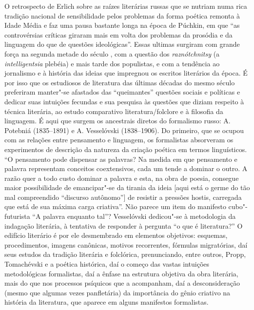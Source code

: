 O retrospecto de Erlich sobre as raízes literárias russas que se nutriam
numa rica tradição nacional de sensibilidade pelos problemas da forma
poética remonta à Idade Média e faz uma pausa bastante longa na época de
Púchkin, em que ``as controvérsias críticas giraram mais em volta dos
problemas da prosódia e da linguagem do que de questões ideológicas''.
Essas ultimas surgiram com grande força na segunda metade do século ,
com a questão dos \emph{raznótchnitsy} (a \emph{intelligentsia} plebéia)
e mais tarde dos populistas, e com a tendência ao jornalismo e à
história das ideias que impregnou os escritos literários da época. É por
isso que os estudiosos de literatura das últimas décadas do mesmo século
preferiram manter"-se afastados das ``queimantes'' questões sociais e políticas e
dedicar suas intuições fecundas e sua pesquisa às questões que diziam
respeito à técnica literária, ao estudo comparativo literatura/folclore
e à filosofia da linguagem. É aqui que surgem os ancestrais diretos do
formalismo russo: A. Potebniá (1835--1891) e A. Vesselóvski (1838--1906).
Do primeiro, que se ocupou com as relações entre pensamento e linguagem,
os formalistas absorveram os experimentos de descrição da natureza da
criação poética em termos linguísticos. ``O pensamento pode dispensar as
palavras? Na medida em que pensamento e palavra
representam conceitos coextensivos, cada um tende a dominar o outro. A
razão quer a todo custo dominar a palavra e esta, na obra de poesia,
consegue maior possibilidade de emancipar"-se da tirania da ideia [aqui
está o germe do tão mal compreendido ``discurso autônomo''] de
resistir a pressões hostis, carregada que está de sua máxima carga
criativa''. Não parece um item do manifesto cubo"-futurista ``A palavra enquanto
tal''? Vesselóvski dedicou"-se à metodologia da indagação literária, à
tentativa de responder à pergunta ``o que é literatura?'' O edifício
literário é por ele desmembrado em elementos objetivos: esquemas,
procedimentos, imagens canônicas, motivos recorrentes, fórmulas
migratórias, daí seus estudos da tradição literária e folclórica,
prenunciando, entre outros, Propp, Tomachévski e a poética histórica,
daí o começo das vastas intuições metodológicas formalistas, daí a
ênfase na estrutura objetiva da obra literária, mais do que nos
processos psíquicos que a acompanham, daí a desconsideração (mesmo que
algumas vezes panfletária) da importância do gênio criativo na
história da literatura, que aparece em alguns manifestos formalistas.

